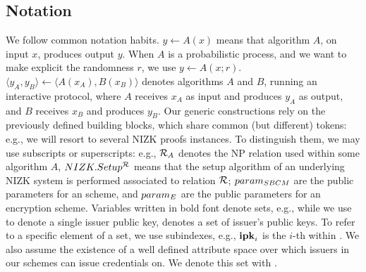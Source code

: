 \subsection{Notation}
\label{ssec:notation}

We follow common notation habits. $y \gets A(x)$ means that algorithm $A$, on
input $x$, produces output $y$. When $A$ is a probabilistic process, and we want
to make explicit the randomness $r$, we use $y \gets A(x;r)$. $\langle y_A,y_B
\rangle \gets \langle A(x_A),B(x_B)\rangle$ denotes algorithms $A$ and $B$,
running an interactive protocol, where $A$ receives $x_A$ as input and produces
$y_A$ as output, and $B$ receives $x_B$ and produces $y_B$.
%
Our generic constructions rely on the previously defined building blocks, which
share common (but different)
tokens: e.g., we will resort to several NIZK proofs instances. To distinguish
them, we may use subscripts or superscripts: e.g., $\mathcal{R}_A$ denotes the
NP relation used within some algorithm $A$, $NIZK.Setup^{\mathcal{R}}$ means that
the setup algorithm of an underlying NIZK system is performed associated to
relation $\mathcal{R}$; $param_{SBCM}$ are the public parameters for an \SBCM scheme,
and $param_{E}$ are the public parameters for an encryption scheme. Variables
written in bold font denote sets, e.g., while we use \ipk to denote a single
issuer public key, \sipk denotes a set of issuer's public keys. To refer to
a specific element of a set, we use subindexes, e.g., $\mathbf{ipk}_i$ is the $i$-th
\ipk within \sipk.
%
We also assume the existence of a well defined attribute space over which
issuers in our schemes can issue credentials on. We denote this set with
\AttrSpace.


